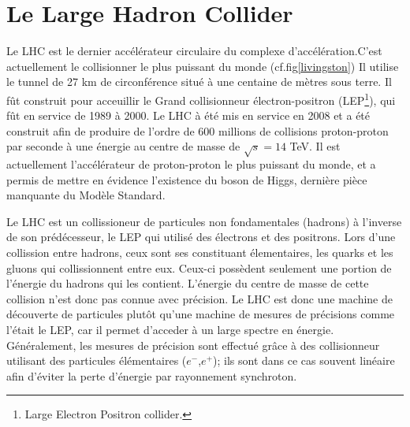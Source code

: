 \section{Le Large Hadron Collider}
Le LHC est le dernier accélérateur circulaire du complexe d'accélération.C'est actuellement le collisionner le plus puissant du monde (cf.fig\ref{livingston}) Il utilise le tunnel de 27 km de circonférence situé à une centaine de mètres sous terre. Il fût construit pour acceuillir le Grand collisionneur électron-positron (LEP\footnote{Large Electron Positron collider.}), qui fût en service de 1989 à 2000. Le LHC à été mis en service en 2008 et a été construit afin de produire de l'ordre de 600 millions de collisions proton-proton par seconde à une énergie au centre de masse de $\sqrt{s}=14$ TeV. Il est actuellement l'accélérateur de proton-proton le plus puissant du monde, et a permis de mettre en évidence l'existence du boson de Higgs, dernière pièce manquante du Modèle Standard.

Le LHC est un collissioneur de particules non fondamentales (hadrons) à l'inverse de son prédécesseur, le LEP qui utilisé des électrons et des positrons. Lors d'une collission entre hadrons, ceux sont ses constituant élementaires, les quarks et les gluons qui collissionnent entre eux. Ceux-ci possèdent seulement une portion de l'énergie du hadrons qui les contient. L'énergie du centre de masse de cette collision n'est donc pas connue avec précision. Le LHC est donc une machine de découverte de particules plutôt qu'une machine de mesures de précisions comme l'était le LEP, car il permet d'acceder à un large spectre en énergie. Généralement, les mesures de précision sont effectué grâce à des collisionneur utilisant des particules élémentaires ($e^{-}$,$e^{+}$); ils sont dans ce cas souvent linéaire afin d'éviter la perte d'énergie par rayonnement synchroton.

